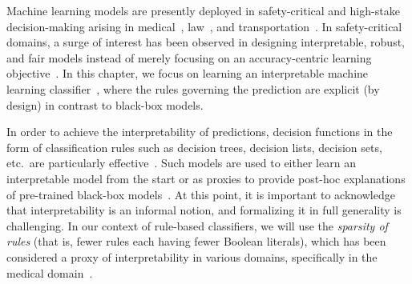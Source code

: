 
\label{chapter:imli}
Machine learning models are presently deployed in safety-critical and high-stake decision-making arising in medical~\cite{erickson2017machine,kaissis2020secure,kononenko2001machine}, law~\cite{kumar2018law,surden2014machine}, and transportation~\cite{peled2019model,zantalis2019review}. In safety-critical domains, a surge of interest has been observed in designing interpretable, robust, and fair models instead of merely focusing on an accuracy-centric learning objective~\cite{bhagoji2018enhancing,doshi2017towards,du2019techniques,hancox2020robustness,holstein2019improving,mehrabi2021survey,molnar2020interpretable,murdoch2019interpretable}. In this chapter, we focus on learning an interpretable machine learning classifier~\cite{rudin2019stop}, where the rules governing the prediction are explicit (by design) in contrast to black-box models. 






In order to achieve the interpretability of predictions, decision functions in the form of classification rules such as decision trees,  decision lists, decision sets, etc.\ are particularly effective~\cite{bessiere2009minimising,dash2021lprules,ignatiev2021reasoning,izza2020explaining,lakkaraju2017interpretable,lakkaraju2016interpretable,letham2015interpretable,narodytska2018learning,rivest1987learning,wang2015falling,yu2020optimal}. Such models are used to either learn an interpretable model from the start or as proxies to provide post-hoc explanations of pre-trained black-box models~\cite{gill2020responsible,lundberg2017unified,moradi2021post,ribeiro2016should,slack2020fooling}.  At this point, it is important to acknowledge that interpretability is an informal notion, and formalizing it in full generality is challenging. In our context of rule-based classifiers, we will use the \emph{sparsity of rules} (that is, fewer rules each having fewer Boolean literals), which has been considered a proxy of interpretability in various domains, specifically in the medical domain~\cite{gage2001validation,lakkaraju2019faithful,letham2015interpretable,malioutov2013exact,myers1962myers}.  

